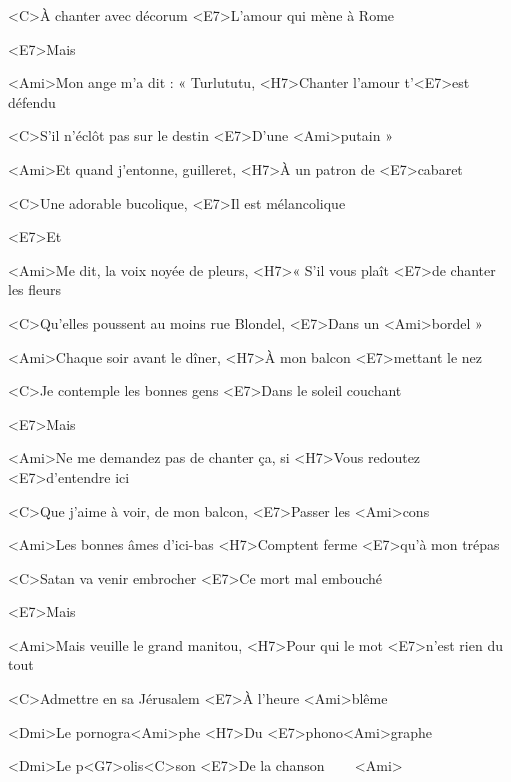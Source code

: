 <C>À chanter avec décorum
<E7>L'amour qui mène à Rome

<E7>Mais

<Ami>Mon ange m'a dit : « Turlututu,
<H7>Chanter l'amour t'<E7>est défendu

<C>S'il n'éclôt pas sur le destin
<E7>D'une <Ami>putain »
\ks

\zr\kr

\zs
<Ami>Et quand j'entonne, guilleret,
<H7>À un patron de <E7>cabaret

<C>Une adorable bucolique,
<E7>Il est mélancolique

<E7>Et

<Ami>Me dit, la voix noyée de pleurs,
<H7>« S'il vous plaît <E7>de chanter les fleurs

<C>Qu'elles poussent au moins rue Blondel,
<E7>Dans un <Ami>bordel »
\ks

\zr\kr

\zs
<Ami>Chaque soir avant le dîner,
<H7>À mon balcon <E7>mettant le nez

<C>Je contemple les bonnes gens
<E7>Dans le soleil couchant

<E7>Mais

<Ami>Ne me demandez pas de chanter ça, si
<H7>Vous redoutez <E7>d'entendre ici

<C>Que j'aime à voir, de mon balcon,
<E7>Passer les <Ami>cons
\ks

\zr\kr

\zs
<Ami>Les bonnes âmes d'ici-bas
<H7>Comptent ferme <E7>qu'à mon trépas

<C>Satan va venir embrocher
<E7>Ce mort mal embouché

<E7>Mais

<Ami>Mais veuille le grand manitou,
<H7>Pour qui le mot <E7>n'est rien du tout

<C>Admettre en sa Jérusalem
<E7>À l'heure <Ami>blême
\ks

\zr
<Dmi>Le pornogra<Ami>phe
<H7>Du <E7>phono<Ami>graphe

<Dmi>Le p<G7>olis<C>son
<E7>De la chanson ~~~ <Ami>
\kr

\kp
